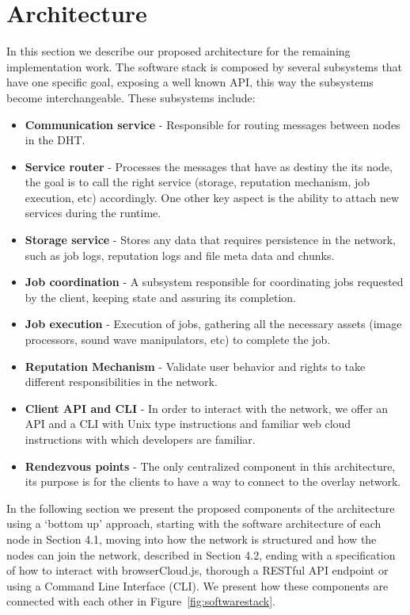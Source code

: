 
% 
% 

\section{Architecture}

In this section we describe our proposed architecture for the remaining implementation work. The software stack is composed by several subsystems that have one specific goal, exposing a well known API, this way the subsystems become interchangeable. These subsystems include:

\begin{itemize}
  \item \textbf{Communication service} - Responsible for routing messages between nodes in the DHT.
  \item \textbf{Service router} - Processes the messages that have as destiny the its node, the goal is to call the right service (storage, reputation mechanism, job execution, etc) accordingly. One other key aspect is the ability to attach new services during the runtime.
  \item \textbf{Storage service} - Stores any data that requires persistence in the network, such as job logs, reputation logs and file meta data and chunks.
  \item \textbf{Job coordination} - A subsystem responsible for coordinating jobs requested by the client, keeping state and assuring its completion.
  \item \textbf{Job execution} - Execution of jobs, gathering all the necessary assets (image processors, sound wave manipulators, etc) to complete the job.
  \item \textbf{Reputation Mechanism} - Validate user behavior and rights to take different responsibilities in the network.
  \item \textbf{Client API and CLI} - In order to interact with the network, we offer an API and a CLI with Unix type instructions and familiar web cloud instructions with which developers are familiar.
  \item \textbf{Rendezvous points} - The only centralized component in this architecture, its purpose is for the clients to have a way to connect to the overlay network. 
\end{itemize}


In the following section we present the proposed components of the architecture using a `bottom up' approach, starting with the software architecture of each node in Section 4.1, moving into how the network is structured and how the nodes can join the network, described in Section 4.2, ending with a specification of how to interact with browserCloud.js, thorough a RESTful API endpoint or using a Command Line Interface (CLI). We present how these components are connected with each other in Figure~\ref{fig:softwarestack}.

